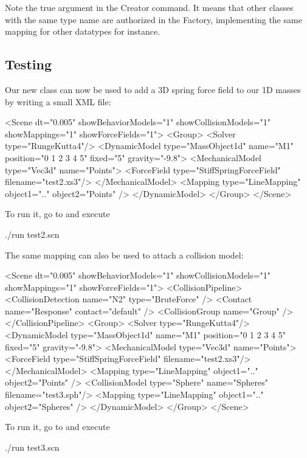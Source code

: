 Note the true argument in the Creator command. It means that other classes with the same type name are authorized in the Factory, implementing the same mapping for other datatypes for instance.

\subsection{Testing}

Our new class can now be used to add a 3D spring force field to our 1D masses by writing a small XML file:

\begin{code_xml}
<Scene dt="0.005" showBehaviorModels="1" showCollisionModels="1" showMappings="1" showForceFields="1">
	<Group>
		<Solver type="RungeKutta4"/>
		<DynamicModel type="MassObject1d" name="M1" position="0 1 2 3 4 5" fixed="5" gravity="-9.8">
		<MechanicalModel type="Vec3d" name="Points">
		<ForceField type="StiffSpringForceField" filename="test2.xs3"/>
		</MechanicalModel>
		<Mapping type="LineMapping" object1=".." object2="Points" />
		</DynamicModel>
	</Group>
</Scene>
\end{code_xml}

To run it, go to  and execute
\begin{code_bash}
./run test2.scn
\end{code_bash}

The same mapping can also be used to attach a collision model:

\begin{code_xml}
<Scene dt="0.005" showBehaviorModels="1" showCollisionModels="1" showMappings="1" showForceFields="1">
	<CollisionPipeline>
		<CollisionDetection name="N2" type="BruteForce" />
		<Contact name="Response" contact="default" />
		<CollisionGroup name="Group" />
	</CollisionPipeline>
	<Group>
		<Solver type="RungeKutta4"/>
		<DynamicModel type="MassObject1d" name="M1" position="0 1 2 3 4 5" fixed="5" gravity="-9.8">
		<MechanicalModel type="Vec3d" name="Points">
		<ForceField type="StiffSpringForceField" filename="test2.xs3"/>
		</MechanicalModel>
		<Mapping type="LineMapping" object1=".." object2="Points" />
		<CollisionModel type="Sphere" name="Spheres" filename="test3.sph"/>
		<Mapping type="LineMapping" object1=".." object2="Spheres" />
		</DynamicModel>
	</Group>
</Scene>
\end{code_xml}

To run it, go to  and execute
\begin{code_bash}
./run test3.scn
\end{code_bash}

